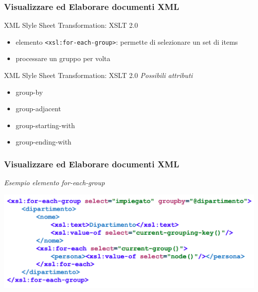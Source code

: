\begin{frame}
    \frametitle{Visualizzare ed Elaborare documenti XML}
    \addtocounter{nframe}{1}
    

     \begin{block}{XML Slyle Sheet Transformation: XSLT 2.0}
        \begin{itemize}
            \item elemento \texttt{<xsl:for-each-group>}: permette di selezionare un set di items
            \item processare un gruppo per volta
        \end{itemize}
        
     \end{block}

     \begin{block}{XML Slyle Sheet Transformation: XSLT 2.0}
        \textit{Possibili attributi}
        \begin{itemize}
            \item group-by
            \item group-adjacent
            \item group-starting-with
            \item group-ending-with
        \end{itemize}
    
    \end{block}

\end{frame}

\begin{frame}
    \frametitle{Visualizzare ed Elaborare documenti XML}
    \addtocounter{nframe}{1}
    
        \textit{Esempio elemento for-each-group}

    \begin{center}
        \includegraphics[width=.8\textwidth]{imgs/esempio-groupBy.png}
    \end{center}

\end{frame}

